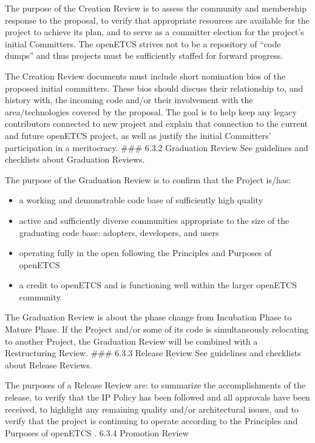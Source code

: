 The purpose of the Creation Review is to assess the community and
membership response to the proposal, to verify that appropriate
resources are available for the project to achieve its plan, and to
serve as a committer election for the project's initial Committers. The
openETCS strives not to be a repository of ``code dumps'' and thus
projects must be sufficiently staffed for forward progress.

The Creation Review documents must include short nomination bios of the
proposed initial committers. These bios should discuss their
relationship to, and history with, the incoming code and/or their
involvement with the area/technologies covered by the proposal. The goal
is to help keep any legacy contributors connected to new project and
explain that connection to the current and future openETCS project, as
well as justify the initial Committers' participation in a meritocracy.
\#\#\# 6.3.2 Graduation Review See guidelines and checklists about
Graduation Reviews.

The purpose of the Graduation Review is to confirm that the Project
is/has:

\begin{itemize}

\item
  a working and demonstrable code base of sufficiently high quality
\item
  active and sufficiently diverse communities appropriate to the size of
  the graduating code base: adopters, developers, and users
\item
  operating fully in the open following the Principles and Purposes of
  openETCS
\item
  a credit to openETCS and is functioning well within the larger
  openETCS community
\end{itemize}

The Graduation Review is about the phase change from Incubation Phase to
Mature Phase. If the Project and/or some of its code is simultaneously
relocating to another Project, the Graduation Review will be combined
with a Restructuring Review. \#\#\# 6.3.3 Release Review See guidelines
and checklists about Release Reviews.

The purposes of a Release Review are: to summarize the accomplishments
of the release, to verify that the IP Policy has been followed and all
approvals have been received, to highlight any remaining quality and/or
architectural issues, and to verify that the project is continuing to
operate according to the Principles and Purposes of openETCS . 6.3.4
Promotion Review

